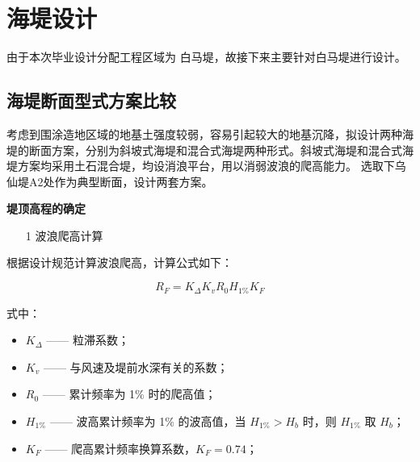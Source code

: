 \documentclass[UTF8, a4paper, 12pt]{ctexart} %
\begin{document}
\section{海堤设计}

由于本次毕业设计分配工程区域为 白马堤，故接下来主要针对白马堤进行设计。
\subsection{海堤断面型式方案比较}
考虑到围涂造地区域的地基土强度较弱，容易引起较大的地基沉降，拟设计两种海堤的断面方案，分别为斜坡式海堤和混合式海堤两种形式。斜坡式海堤和混合式海堤方案均采用土石混合堤，均设消浪平台，用以消弱波浪的爬高能力。
选取下乌仙堤A2处作为典型断面，设计两套方案。
\par
\textbf{堤顶高程的确定}
\par
\begin{itemize}
    \item[1] 波浪爬高计算
\end{itemize}
根据设计规范计算波浪爬高，计算公式如下：

\begin{equation}
    R_F = K_\Delta K_v R_0 H_{1\%} K_F
\end{equation}

式中：
\begin{itemize}
    \item $K_\Delta$ —— 粒滞系数；
    \item $K_v$ —— 与风速及堤前水深有关的系数；
    \item $R_0$ —— 累计频率为 1\% 时的爬高值；
    \item $H_{1\%}$ —— 波高累计频率为 1\% 的波高值，当 $H_{1\%} > H_b$ 时，则 $H_{1\%}$ 取 $H_b$；
    \item $K_F$ —— 爬高累计频率换算系数，$K_F = 0.74$；
\end{itemize}
\end{document}
